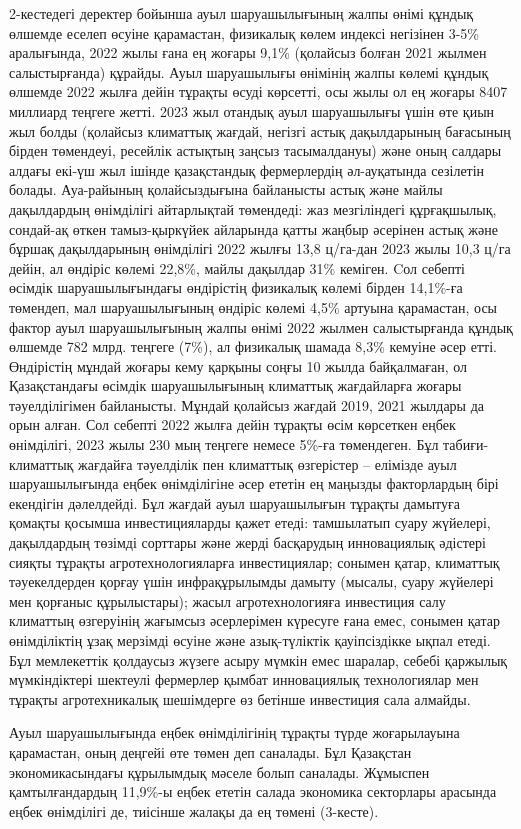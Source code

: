 \begin{multicols}{2}
2-кестедегі деректер бойынша ауыл шаруашылығының жалпы өнімі құндық
өлшемде еселеп өсуіне қарамастан, физикалық көлем индексі негізінен
3-5\% аралығында, 2022 жылы ғана ең жоғары 9,1\% (қолайсыз болған 2021
жылмен салыстырғанда) құрайды. Ауыл шаруашылығы өнімінің жалпы көлемі
құндық өлшемде 2022 жылға дейін тұрақты өсуді көрсетті, осы жылы ол ең
жоғары 8407 миллиард теңгеге жетті. 2023 жыл отандық ауыл шаруашылығы
үшін өте қиын жыл болды (қолайсыз климаттық жағдай, негізгі астық
дақылдарының бағасының бірден төмендеуі, ресейлік астықтың заңсыз
тасымалдануы) және оның салдары алдағы екі-үш жыл ішінде қазақстандық
фермерлердің әл-ауқатында сезілетін болады. Ауа-райының қолайсыздығына
байланысты астық және майлы дақылдардың өнімділігі айтарлықтай
төмендеді: жаз мезгіліндегі құрғақшылық, сондай-ақ өткен тамыз-қыркүйек
айларында қатты жаңбыр әсерінен астық және бұршақ дақылдарының
өнімділігі 2022 жылғы 13,8 ц/га-дан 2023 жылы 10,3 ц/га дейін, ал
өндіріс көлемі 22,8\%, майлы дақылдар 31\% кеміген. Cол себепті өсімдік
шаруашылығындағы өндірістің физикалық көлемі бірден 14,1\%-ға төмендеп,
мал шаруашылығының өндіріс көлемі 4,5\% артуына қарамастан, осы фактор
ауыл шаруашылығының жалпы өнімі 2022 жылмен салыстырғанда құндық өлшемде
782 млрд. теңгеге (7\%), ал физикалық шамада 8,3\% кемуіне әсер етті.
Өндірістің мұндай жоғары кему қарқыны соңғы 10 жылда байқалмаған, ол
Қазақстандағы өсімдік шаруашылығының климаттық жағдайларға жоғары
тәуелділігімен байланысты. Мұндай қолайсыз жағдай 2019, 2021 жылдары да
орын алған. Сол себепті 2022 жылға дейін тұрақты өсім көрсеткен еңбек
өнімділігі, 2023 жылы 230 мың теңгеге немесе 5\%-ға төмендеген. Бұл
табиғи-климаттық жағдайға тәуелділік пен климаттық өзгерістер --
елімізде ауыл шаруашылығында еңбек өнімділігіне әсер ететін ең маңызды
факторлардың бірі екендігін дәлелдейді. Бұл жағдай ауыл шаруашылығын
тұрақты дамытуға қомақты қосымша инвестицияларды қажет етеді: тамшылатып
суару жүйелері, дақылдардың төзімді сорттары және жерді басқарудың
инновациялық әдістері сияқты тұрақты агротехнологияларға инвестициялар;
сонымен қатар, климаттық тәуекелдерден қорғау үшін инфрақұрылымды дамыту
(мысалы, суару жүйелері мен қорғаныс құрылыстары); жасыл
агротехнологияға инвестиция салу климаттың өзгеруінің жағымсыз
әсерлерімен күресуге ғана емес, сонымен қатар өнімділіктің ұзақ мерзімді
өсуіне және азық-түліктік қауіпсіздікке ықпал етеді. Бұл мемлекеттік
қолдаусыз жүзеге асыру мүмкін емес шаралар, себебі қаржылық
мүмкіндіктері шектеулі фермерлер қымбат инновациялық технологиялар мен
тұрақты агротехникалық шешімдерге өз бетінше инвестиция сала алмайды.

Ауыл шаруашылығында еңбек өнімділігінің тұрақты түрде жоғарылауына
қарамастан, оның деңгейі өте төмен деп саналады. Бұл Қазақстан
экономикасындағы құрылымдық мәселе болып саналады. Жұмыспен
қамтылғандардың 11,9\%-ы еңбек ететін салада экономика секторлары
арасында еңбек өнімділігі де, тиісінше жалақы да ең төмені (3-кесте).
\end{multicols}

